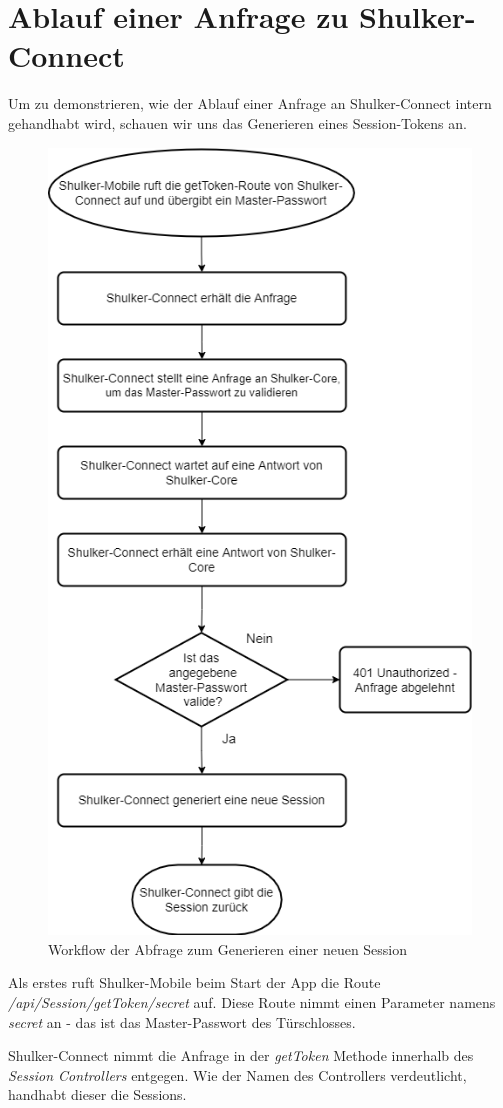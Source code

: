 \section{Ablauf einer Anfrage zu Shulker-Connect}
Um zu demonstrieren, wie der Ablauf einer Anfrage an Shulker-Connect intern gehandhabt wird, schauen wir uns das Generieren
eines Session-Tokens an.

\begin{figure}[H]
    \begin{center}
        \includegraphics[width=.6\textwidth]{images/connect/AblaufGetToken.png}
        \caption{Workflow der Abfrage zum Generieren einer neuen Session}
    \end{center}
\end{figure}
\pagebreak
Als erstes ruft Shulker-Mobile beim Start der App die Route \textit{/api/Session/getToken/{secret}} auf.
Diese Route nimmt einen Parameter namens \textit{secret} an - das ist das Master-Passwort des Türschlosses.

Shulker-Connect nimmt die Anfrage in der \textit{getToken} Methode innerhalb des \textit{Session Controllers} entgegen.
Wie der Namen des Controllers verdeutlicht, handhabt dieser die Sessions.

